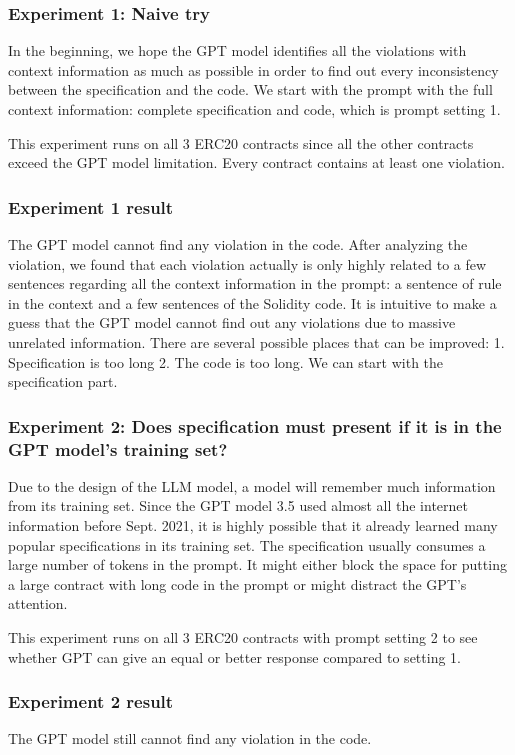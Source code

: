 \subsubsection{ Experiment 1: Naive try }
In the beginning, we hope the GPT model identifies all the violations with context information as much as  possible in order to find out every inconsistency between the specification and the code.
We start with the prompt with the full context information: complete specification and code, which is prompt setting 1.

This experiment runs on all 3 ERC20 contracts since all the other contracts exceed the GPT model limitation. 
Every contract contains at least one violation.

\subsubsection{ Experiment 1 result }
The GPT model cannot find any violation in the code. 
After analyzing the violation, we found that each violation actually is only highly related to a few sentences regarding all the context information in the prompt: a sentence of rule in the context and a few sentences of the Solidity code. 
It is intuitive to make a guess that the GPT model cannot find out any violations due to massive unrelated information.
There are several possible places that can be improved: 1. Specification is too long 2. The code is too long.
We can start with the specification part.

\subsubsection{ Experiment 2: Does specification must present if it is in the GPT model's training set? }
Due to the design of the LLM model, a model will remember much information from its training set. Since the GPT model 3.5 used almost all the internet information before Sept. 2021, it is highly possible that it already learned many popular specifications in its training set. The specification usually consumes a large number of tokens in the prompt. It might either block the space for putting a large contract with long code in the prompt or might distract the GPT's attention. 

This experiment runs on all 3 ERC20 contracts with prompt setting 2 to see whether GPT can give an equal or better response compared to setting 1.


\subsubsection{ Experiment 2 result}
The GPT model still cannot find any violation in the code.

